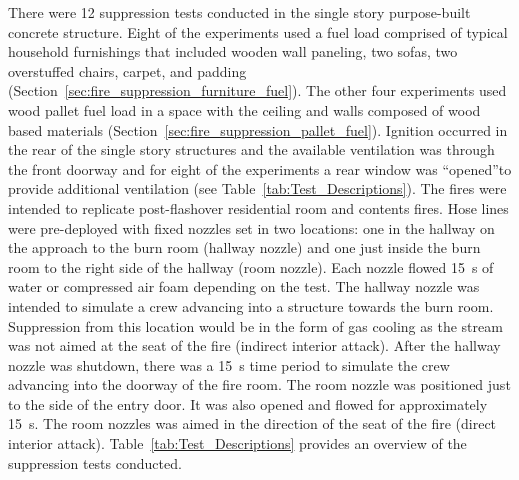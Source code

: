 \documentclass[12pt,oneside]{book}
\begin{document}
There were 12 suppression tests conducted in the single story purpose-built concrete structure. Eight of the experiments used a fuel load comprised of typical household furnishings that included wooden wall paneling, two sofas, two overstuffed chairs, carpet, and padding (Section~\ref{sec:fire_suppression_furniture_fuel}). The other four experiments used wood pallet fuel load in a space with the ceiling and walls composed of wood based materials (Section~\ref{sec:fire_suppression_pallet_fuel}). Ignition occurred in the rear of the single story structures and the available ventilation was through the front doorway and for eight of the experiments a rear window was ``opened''to provide additional ventilation (see Table~\ref{tab:Test_Descriptions}). The fires were intended to replicate post-flashover residential room and contents fires. Hose lines were pre-deployed with fixed nozzles set in two locations: one in the hallway on the approach to the burn room (hallway nozzle) and one just inside the burn room to the right side of the hallway (room nozzle). Each nozzle flowed 15~s of water or compressed air foam depending on the test. The hallway nozzle was intended to simulate a crew advancing into a structure towards the burn room. Suppression from this location would be in the form of gas cooling as the stream was not aimed at the seat of the fire (indirect interior attack).  After the hallway nozzle was shutdown, there was a 15~s time period to simulate the crew advancing into the doorway of the fire room. The room nozzle was positioned just to the side of the entry door.  It was also opened and flowed for approximately 15~s. The room nozzles was aimed in the direction of the seat of the fire (direct interior attack). Table~\ref{tab:Test_Descriptions} provides an overview of the suppression tests conducted.
\end{document}
